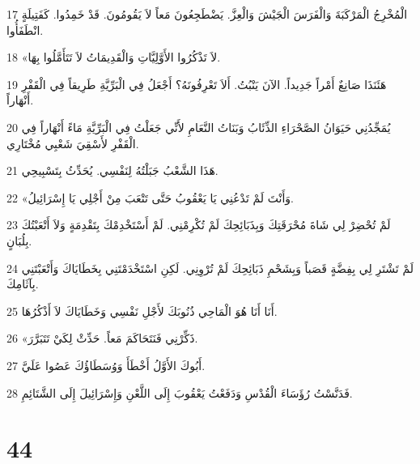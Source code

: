 \par 17 الْمُخْرِجُ الْمَرْكَبَةَ وَالْفَرَسَ الْجَيْشَ وَالْعِزَّ. يَضْطَجِعُونَ مَعاً لاَ يَقُومُونَ. قَدْ خَمِدُوا. كَفَتِيلَةٍ انْطَفَأُوا.
\par 18 «لاَ تَذْكُرُوا الأَوَّلِيَّاتِ وَالْقَدِيمَاتُ لاَ تَتَأَمَّلُوا بِهَا.
\par 19 هَئَنَذَا صَانِعٌ أَمْراً جَدِيداً. الآنَ يَنْبُتُ. أَلاَ تَعْرِفُونَهُ؟ أَجْعَلُ فِي الْبَرِّيَّةِ طَرِيقاً فِي الْقَفْرِ أَنْهَاراً.
\par 20 يُمَجِّدُنِي حَيَوَانُ الصَّحْرَاءِ الذِّئَابُ وَبَنَاتُ النَّعَامِ لأَنِّي جَعَلْتُ فِي الْبَرِّيَّةِ مَاءً أَنْهَاراً فِي الْقَفْرِ لأَسْقِيَ شَعْبِي مُخْتَارِي.
\par 21 هَذَا الشَّعْبُ جَبَلْتُهُ لِنَفْسِي. يُحَدِّثُ بِتَسْبِيحِي.
\par 22 «وَأَنْتَ لَمْ تَدْعُنِي يَا يَعْقُوبُ حَتَّى تَتْعَبَ مِنْ أَجْلِي يَا إِسْرَائِيلُ.
\par 23 لَمْ تُحْضِرْ لِي شَاةَ مُحْرَقَتِكَ وَبِذَبَائِحِكَ لَمْ تُكْرِمْنِي. لَمْ أَسْتَخْدِمْكَ بِتَقْدِمَةٍ وَلاَ أَتْعَبْتُكَ بِلُبَانٍ.
\par 24 لَمْ تَشْتَرِ لِي بِفِضَّةٍ قَصَباً وَبِشَحْمِ ذَبَائِحِكَ لَمْ تُرْوِنِي. لَكِنِ اسْتَخْدَمْتَنِي بِخَطَايَاكَ وَأَتْعَبْتَنِي بِآثَامِكَ.
\par 25 أَنَا أَنَا هُوَ الْمَاحِي ذُنُوبَكَ لأَجْلِ نَفْسِي وَخَطَايَاكَ لاَ أَذْكُرُهَا.
\par 26 «ذَكِّرْنِي فَنَتَحَاكَمَ مَعاً. حَدِّثْ لِكَيْ تَتَبَرَّرَ.
\par 27 أَبُوكَ الأَوَّلُ أَخْطَأَ وَوُسَطَاؤُكَ عَصُوا عَلَيَّ.
\par 28 فَدَنَّسْتُ رُؤَسَاءَ الْقُدْسِ وَدَفَعْتُ يَعْقُوبَ إِلَى اللَّعْنِ وَإِسْرَائِيلَ إِلَى الشَّتَائِمِ.

\chapter{44}

